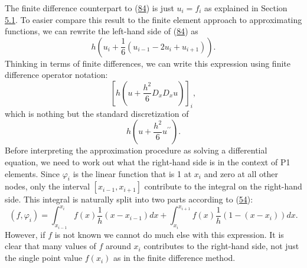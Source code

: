 \documentclass[../main.tex]{subfiles}
\begin{document}
	The finite difference counterpart to (\hyperref[eqa84]{84}) is just $u_{i}=f_{i}$ as explained in Section \hyperref[sec:sec_5_1]{5.1}. To easier compare this result to the finite element approach to approximating functions, we can rewrite the left-hand side of (\hyperref[eqa84]{84}) as
	\begin{equation}\label{eqa85}
		h\left(u_{i}+\frac{1}{6}\left(u_{i-1}-2 u_{i}+u_{i+1}\right)\right).
	\end{equation}
	Thinking in terms of finite differences, we can write this expression using finite difference operator notation:
	$$
	\left[h\left(u+\frac{h^{2}}{6} D_{x} D_{x} u\right)\right]_{i},
	$$
	which is nothing but the standard discretization of
	$$
	h\left(u+\frac{h^{2}}{6} u^{\prime \prime}\right) .
	$$
	Before interpreting the approximation procedure as solving a differential equation, we need to work out what the right-hand side is in the context of P1 elements. Since $\varphi_{i}$ is the linear function that is 1 at $x_{i}$ and zero at all other nodes, only the interval $\left[x_{i-1}, x_{i+1}\right]$ contribute to the integral on the right-hand side. This integral is naturally split into two parts according to (\hyperref[eqa54]{54}):
	$$
	\left(f, \varphi_{i}\right)=\int_{x_{i-1}}^{x_{i}} f(x) \frac{1}{h}\left(x-x_{i-1}\right) d x+\int_{x_{i}}^{x_{i+1}} f(x) \frac{1}{h}\left(1-\left(x-x_{i}\right)\right) d x.
	$$
	However, if $f$ is not known we cannot do much else with this expression. It is clear that many values of $f$ around $x_{i}$ contributes to the right-hand side, not just the single point value $f\left(x_{i}\right)$ as in the finite difference method.
	
\end{document}

